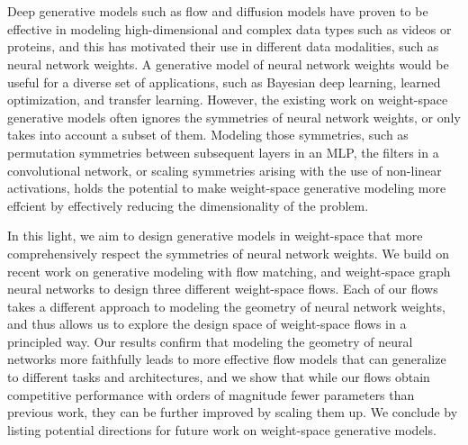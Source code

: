 \chapter{\abstractname}

Deep generative models such as flow and diffusion models have proven to be effective in modeling high-dimensional and complex data types such as videos or proteins, and this has motivated their use in different data modalities, such as neural network weights. A generative model of neural network weights would be useful for a diverse set of applications, such as Bayesian deep learning, learned optimization, and transfer learning. However, the existing work on weight-space generative models often ignores the symmetries of neural network weights, or only takes into account a subset of them. Modeling those symmetries, such as permutation symmetries between subsequent layers in an MLP, the filters in a convolutional network, or scaling symmetries arising with the use of non-linear activations, holds the potential to make weight-space generative modeling more effcient by effectively reducing the dimensionality of the problem. 

In this light, we aim to design generative models in weight-space that more comprehensively respect the symmetries of neural network weights. We build on recent work on generative modeling with flow matching, and weight-space graph neural networks to design three different weight-space flows. Each of our flows takes a different approach to modeling the geometry of neural network weights, and thus allows us to explore the design space of weight-space flows in a principled way. Our results confirm that modeling the geometry of neural networks more faithfully leads to more effective flow models that can generalize to different tasks and architectures, and we show that while our flows obtain competitive performance with orders of magnitude fewer parameters than previous work, they can be further improved by scaling them up. We conclude by listing potential directions for future work on weight-space generative models.
